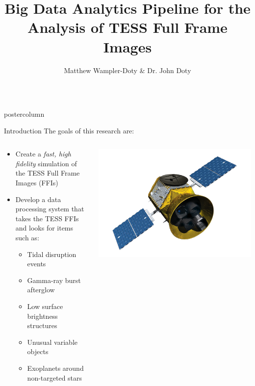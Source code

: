 \documentclass[final,hyperref={pdfpagelabels=false}]{beamer}
\title{\LARGE Big Data Analytics Pipeline for the Analysis of TESS Full Frame Images}
\author{Matthew Wampler-Doty \& Dr. John Doty}
\institute[Noqsi Aerospace]{Noqsi Aerospace, Ltd. \& MIT}
\date[]{}
\newlength{\columnheight}
\begin{document}
\begin{frame}
  \begin{columns}
    \begin{column}{.49\textwidth}
      \begin{beamercolorbox}[center,wd=\textwidth]{postercolumn}
        \begin{minipage}[T]{.95\textwidth}  %
          \parbox[t][\columnheight]{\textwidth}{
            \begin{block}{Introduction}
	    The goals of this research are:
            \begin{columns}
	            \begin{column}{.70\textwidth}
		              \begin{itemize}
		              \item Create a \emph{fast, high fidelity} simulation of the TESS Full Frame Images (FFIs)
		              \item Develop a data processing system that takes the TESS FFIs and looks for items such as:
		              \begin{itemize}
		              	\item Tidal disruption events
			        \item Gamma-ray burst afterglow
				\item Low surface brightness structures
				\item Unusual variable objects
				\item Exoplanets around non-targeted stars
		              \end{itemize}
		              \end{itemize}
		     \end{column}
		     \begin{column}{.28\textwidth}
		     \includegraphics[width=0.80\linewidth]{figures/TESS.png}
		     \end{column}         
              \end{columns}
            \end{block}

}
\end{minipage}
\end{beamercolorbox}
\end{column}
\end{columns}
\end{frame}
\end{document}
